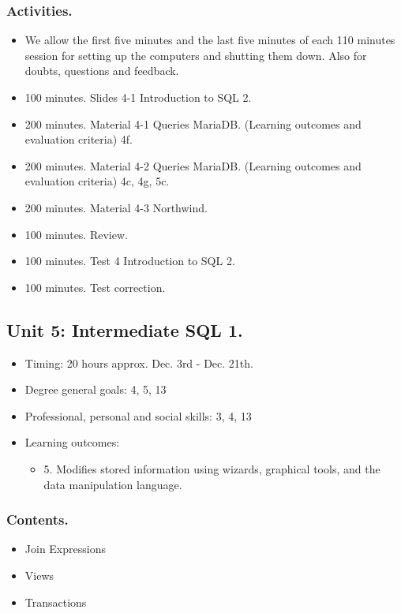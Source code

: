 \documentclass[catalan, a4paper, 12pt, titlepage]{article}
\begin{document}
  \subsubsection{Activities.}

  \begin{itemize}
          \item We allow the first five minutes and the last five minutes of each 110 minutes session for setting up the computers and shutting them down. Also for doubts, questions and feedback.
	  \item 100 minutes. Slides 4-1 Introduction to SQL 2.
	  \item 200 minutes. Material 4-1 Queries MariaDB. (\faGraduationCap Learning outcomes and evaluation criteria) 4f.
	  \item 200 minutes. Material 4-2 Queries MariaDB. (\faGraduationCap Learning outcomes and evaluation criteria) 4c, 4g, 5c.
	  \item 200 minutes. Material 4-3 Northwind.
	  \item 100 minutes. Review.
	  \item 100 minutes. Test 4 Introduction to SQL 2.
	  \item 100 minutes. Test correction.
  \end{itemize}

  \subsection{Unit 5: Intermediate SQL 1.}
  
  \begin{itemize}
	\item Timing: 20 hours approx. Dec. 3rd - Dec. 21th.
	\item Degree general goals: 4, 5, 13
	\item Professional, personal and social skills: 3, 4, 13
	\item Learning outcomes: 
		\begin{itemize}
			\item 5. Modifies stored information using wizards, graphical tools, and the data manipulation language.
		\end{itemize}
  \end{itemize}

  \subsubsection{Contents.}

  \begin{itemize}
	  \item Join Expressions
	  \item Views
	  \item Transactions
  \end{itemize}
\end{document}
